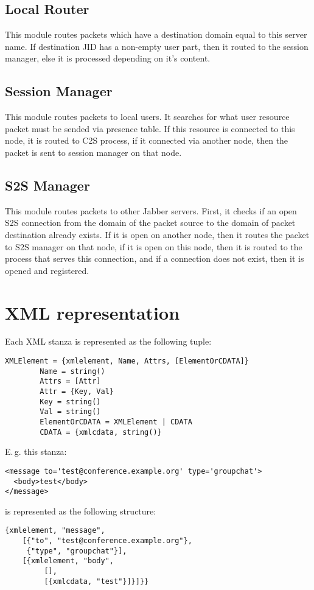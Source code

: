 \documentclass[a4paper,10pt]{article}
\newcommand{\Jabber}{Jabber}
\begin{document}
\subsection{Local Router}

This module routes packets which have a destination domain equal to this server
name.  If destination JID has a non-empty user part, then it routed to the
session manager, else it is processed depending on it's content.


\subsection{Session Manager}

This module routes packets to local users.  It searches for what user resource
packet must be sended via presence table.  If this resource is connected to
this node, it is routed to C2S process, if it connected via another node, then
the packet is sent to session manager on that node.


\subsection{S2S Manager}

This module routes packets to other \Jabber{} servers.  First, it checks if an
open S2S connection from the domain of the packet source to the domain of
packet destination already exists. If it is open on another node, then it
routes the packet to S2S manager on that node, if it is open on this node, then
it is routed to the process that serves this connection, and if a connection
does not exist, then it is opened and registered.




\section{XML representation}
\label{sec:xmlrepr}

Each XML stanza is represented as the following tuple:
\begin{verbatim}
XMLElement = {xmlelement, Name, Attrs, [ElementOrCDATA]}
        Name = string()
        Attrs = [Attr]
        Attr = {Key, Val}
        Key = string()
        Val = string()
        ElementOrCDATA = XMLElement | CDATA
        CDATA = {xmlcdata, string()}
\end{verbatim}
E.\,g. this stanza:
\begin{verbatim}
<message to='test@conference.example.org' type='groupchat'>
  <body>test</body>
</message>
\end{verbatim}
is represented as the following structure:
\begin{verbatim}
{xmlelement, "message",
    [{"to", "test@conference.example.org"},
     {"type", "groupchat"}],
    [{xmlelement, "body",
         [],
         [{xmlcdata, "test"}]}]}}
\end{verbatim}
\end{document}
